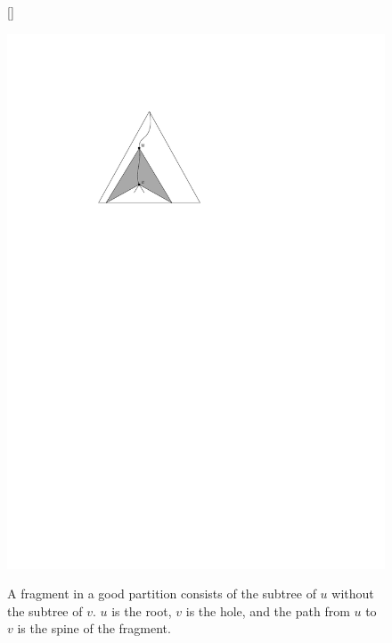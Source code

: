 \documentclass[a4paper,UKenglish]{lipics-v2016}
\theoremstyle{plain}
\begin{document}
\begin{figure}
[\FBwidth]
{\caption{A fragment in a good partition consists of the subtree of $u$ without the subtree of $v$.
$u$ is the root, $v$ is the hole, and the path from $u$ to $v$ is the spine of the fragment.}}
{\includegraphics[scale=0.7]{fragment}}
\end{figure}
 
\end{document}
